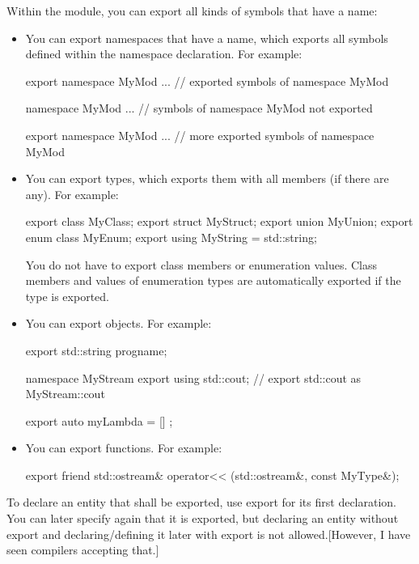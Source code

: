 Within the module, you can export all kinds of symbols that have a name:

\begin{itemize}
\item 
You can export namespaces that have a name, which exports all symbols defined within the namespace declaration. For example:

\begin{cpp}
export namespace MyMod {
	... // exported symbols of namespace MyMod
}

namespace MyMod {
	... // symbols of namespace MyMod not exported
}

export namespace MyMod {
	... // more exported symbols of namespace MyMod
}
\end{cpp}


\item 
You can export types, which exports them with all members (if there are any). For example:

\begin{cpp}
export class MyClass;
export struct MyStruct;
export union MyUnion;
export enum class MyEnum;
export using MyString = std::string;
\end{cpp}

You do not have to export class members or enumeration values. Class members and values of enumeration types are automatically exported if the type is exported.

\item 
You can export objects. For example:

\begin{cpp}
export std::string progname;

namespace MyStream {
	export using std::cout; // export std::cout as MyStream::cout
}

export auto myLambda = [] {};
\end{cpp}

\item 
You can export functions. For example:

\begin{cpp}
export friend std::ostream& operator<< (std::ostream&, const MyType&);
\end{cpp}
\end{itemize}

To declare an entity that shall be exported, use export for its first declaration. You can later specify again that it is exported, but declaring an entity without export and declaring/defining it later with export is not allowed.[However, I have seen compilers accepting that.]


